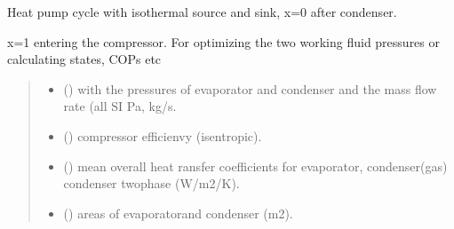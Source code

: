 \documentclass[letterpaper,10pt,english]{sphinxmanual}
\begin{document}

\begin{fulllineitems}
\label{\detokenize{heat_pump_rp:heat_pump_rp.heat_pump_ht}}
\pysigstartsignatures
{}
\pysigstopsignatures
\sphinxAtStartPar
Heat pump cycle with isothermal source and sink, x=0 after condenser.

\sphinxAtStartPar
x=1 entering the compressor. For optimizing the two working fluid pressures
or calculating states, COPs etc
\begin{quote}\begin{description}
\begin{itemize}
\item {} 
\sphinxAtStartPar
{} (\sphinxstyleliteralemphasis{\sphinxupquote{, }}) \textendash{} with the pressures of evaporator and condenser and  the
mass flow rate (all SI Pa, kg/s.

\item {} 
\sphinxAtStartPar
{} () \textendash{} compressor efficienvy (isentropic).

\item {} 
\sphinxAtStartPar
{} (\sphinxstyleliteralemphasis{\sphinxupquote{, }}) \textendash{} mean overall heat ransfer coefficients for evaporator, condenser(gas)
condenser two\sphinxhyphen{}phase (W/m2/K).

\item {} 
\sphinxAtStartPar
{} (\sphinxstyleliteralemphasis{\sphinxupquote{, }}) \textendash{} areas of evaporatorand condenser (m2).


\end{itemize}
\end{description}
\end{quote}
\end{fulllineitems}
\end{document}
